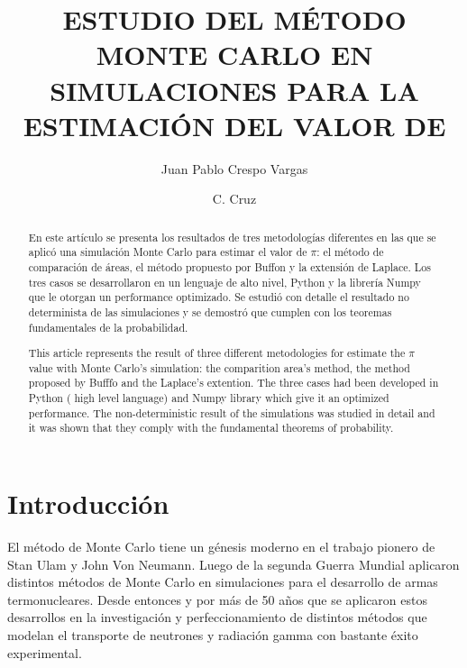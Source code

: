 \documentclass{rbf}
\begin{document}
\title{ESTUDIO DEL MÉTODO MONTE CARLO EN SIMULACIONES PARA LA ESTIMACIÓN DEL VALOR DE \pi}

\author{Juan Pablo Crespo Vargas\marca{*}}
%


\author{C. Cruz \marca{**}}
%


\begin{abstract}
\Resumen
En este artículo se presenta los resultados de tres metodologías diferentes en las que se aplicó una simulación Monte Carlo para estimar el valor de $\pi$: el método de comparación de áreas, el método propuesto por Buffon y la extensión de Laplace. Los tres casos se desarrollaron en un lenguaje de alto nivel, Python y la librería Numpy que le otorgan un performance optimizado. Se estudió con detalle el resultado no determinista de las simulaciones y se demostró que cumplen con los teoremas fundamentales de la probabilidad.



\Abstract
This article represents the result of three different metodologies for estimate the $\pi$ value with Monte Carlo's simulation: the comparition area's method, the method proposed by Bufffo and the Laplace's extention. The three cases had been developed in  Python ( high level language) and Numpy library which give it an optimized performance. The non-deterministic result of the simulations was studied in detail and it was shown that they comply with the fundamental theorems of probability.

\end{abstract}

\maketitle


\section{Introducción}
El método de Monte Carlo tiene un génesis moderno en el trabajo pionero de Stan Ulam y John Von Neumann. Luego de la segunda Guerra Mundial aplicaron distintos métodos de Monte Carlo en simulaciones para el desarrollo de armas termonucleares. Desde entonces y por más de 50 años que se aplicaron estos desarrollos en la investigación y perfeccionamiento de distintos métodos que modelan el transporte de neutrones y radiación gamma con bastante éxito experimental\cite{Kling}. 
\end{document}

